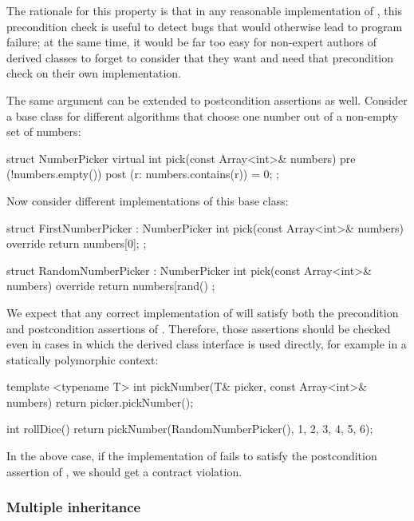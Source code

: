 The rationale for this property is that in any reasonable implementation of , this precondition check is useful to detect bugs that would otherwise lead to program failure; at the same time, it would be far too easy for non-expert authors of derived classes to forget to consider that they want and need that precondition check on their own implementation.

The same argument can be extended to postcondition assertions as well. Consider a base class for different algorithms that choose one number out of a non-empty set of numbers:
\begin{codeblock}
struct NumberPicker {
  virtual int pick(const Array<int>& numbers)
    pre (!numbers.empty())
    post (r: numbers.contains(r)) = 0;
};
\end{codeblock}
Now consider different implementations of this base class:
\begin{codeblock}
struct FirstNumberPicker : NumberPicker {
  int pick(const Array<int>& numbers) override {
    return numbers[0];
  }
};

struct RandomNumberPicker : NumberPicker {
  int pick(const Array<int>& numbers) override {
    return numbers[rand() %
  }
};
\end{codeblock}
We expect that any correct implementation of   will satisfy both the precondition and postcondition assertions of . Therefore, those assertions should be checked even in cases in which the derived class interface is used directly, for example in a statically polymorphic context:
\begin{codeblock}
template <typename T>
int pickNumber(T& picker, const Array<int>& numbers) {
  return picker.pickNumber();
}

int rollDice() {
  return pickNumber(RandomNumberPicker(), {1, 2, 3, 4, 5, 6});
}
\end{codeblock}
In the above case, if the implementation of  fails to satisfy the postcondition assertion of , we should get a contract violation.




\subsubsection{Multiple inheritance}

